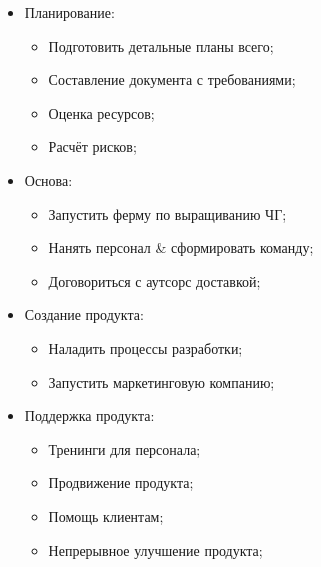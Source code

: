 \documentclass[a4paper,10pt]{article}
\begin{document}
    \begin{itemize}
        \item Планирование:
            \begin{itemize}
                \item Подготовить детальные планы всего;
                \item Составление документа с требованиями;
                \item Оценка ресурсов;
                \item Расчёт рисков;
            \end{itemize}
        \item Основа:
            \begin{itemize}
                \item Запустить ферму по выращиванию ЧГ;
                \item Нанять персонал \& сформировать команду;
                \item Договориться с аутсорс доставкой;
            \end{itemize}
        \item Создание продукта:
            \begin{itemize}
                \item Наладить процессы разработки;
                \item Запустить маркетинговую компанию;
            \end{itemize}
        \item Поддержка продукта:
            \begin{itemize}
                \item Тренинги для персонала;
                \item Продвижение продукта;
                \item Помощь клиентам;
                \item Непрерывное улучшение продукта;
            \end{itemize}
    \end{itemize}
\end{document}
